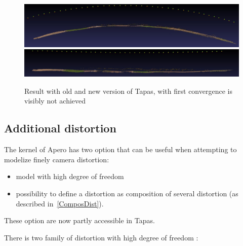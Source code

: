\begin{figure}
\begin{center}
   \includegraphics[width=120mm]{FIGS/NewTapas/Old00.jpg}
   \includegraphics[width=120mm]{FIGS/NewTapas/New00.jpg}
\end{center}
\caption{Result with old and new version of Tapas, with first convergence is visibly not achieved}
\label{ImOldNewTapas}
\end{figure}



\subsection{Additional distortion}

The kernel of Apero has two option that can be useful when attempting to modelize finely camera distortion:

\begin{itemize}
   \item model with high degree of freedom
   \item possibility to define a distortion as composition of several distortion (as described in~\ref{ComposDist}).
\end{itemize}

These option are now partly accessible in Tapas.

There is two family of distortion with high degree of freedom :


